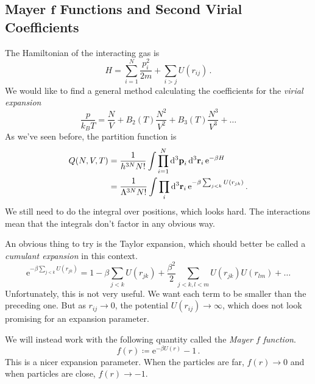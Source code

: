 \documentclass{article}
\theoremstyle{plain}\theoremheaderfont{\normalfont\bfseries}\theorembodyfont{\rmfamily}\theoremseparator{.}\newtheorem*{thm}{Theorem}\newtheorem*{law}{Law}\newtheorem*{pos}{Postulate}
\numberwithin{equation}{section}
\newcommand{\ee}{\mathrm{e}}
\newcommand{\dd}[2][]{\mathrm{d}^{#1} #2\,}
\newcommand{\vb}[1]{\bm{\mathrm{#1}}}
\begin{document}
    \subsection{Mayer \texorpdfstring{\(\bm{f}\)}{f} Functions and Second Virial Coefficients}
    The Hamiltonian of the interacting gas is
    \begin{equation}
        H=\sum_{i=1}^{N}\frac{p_i^2}{2m}+\sum_{i>j}U(r_{ij})\,.
    \end{equation}
    We would like to find a general method calculating the coefficients for the \textit{virial expansion}
    \begin{equation}
        \frac{p}{k_B T}=\frac{N}{V}+B_2(T)\frac{N^2}{V^2}+B_3(T)\frac{N^3}{V^3}+\dots
    \end{equation}
    As we've seen before, the partition function is
    \begin{align}
        Q(N,V,T)&=\frac{1}{h^{3N}N!}\int\prod_{i=1}^{N}\dd[3]{\vb{p}_i}\dd[3]{\vb{r}_i}\ee^{-\beta H}\notag\\
        &=\frac{1}{\Lambda^{3N}N!}\int\prod_{i}\dd[3]{\vb{r}_i}\ee^{-\beta\sum_{j<k}U(r_{jk})}\,.
    \end{align}
    We still need to do the integral over positions, which looks hard. The interactions mean that the integrals don't factor in any obvious way.

    An obvious thing to try is the Taylor expansion, which should better be called a \textit{cumulant expansion} in this context.
    \begin{equation}
        \ee^{-\beta\sum_{j<k}U(r_{jk})}=1-\beta\sum_{j<k}U(r_{jk})+\frac{\beta^2}{2}\sum_{j<k,l<m}U(r_{jk})U(r_{lm})+\dots
    \end{equation}
    Unfortunately, this is not very useful. We want each term to be smaller than the preceding one. But as \(r_{ij}\to 0\), the potential \(U(r_{ij})\to\infty\), which does not look promising for an expansion parameter.

    We will instead work with the following quantity called the \textit{Mayer \(f\) function}.
    \begin{equation}
        f(r)\coloneqq \ee^{-\beta U(r)}-1\,.
    \end{equation}
    This is a nicer expansion parameter. When the particles are far, \(f(r)\to 0\) and when particles are close, \(f(r)\to -1\).
\end{document}
